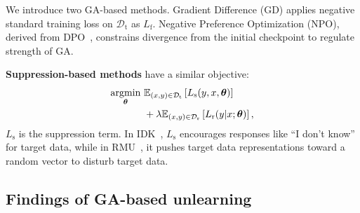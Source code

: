 We introduce two GA-based methods. Gradient Difference (GD) \cite{liu2022continual} applies negative standard training loss on $\mathcal{D}_{\mathrm{t}}$ as $L_{\mathrm{f}}$. Negative Preference Optimization (NPO)\cite{zhang2024negative}, derived from DPO~\cite{rafailov2024direct}, constrains divergence from the initial checkpoint to regulate strength of GA.



\textbf{Suppression-based methods} have a similar objective: \vspace{-0.2in}
\begin{align}
    \underset{\boldsymbol{\theta}}{\operatorname{argmin}} ~ & \mathbb{E}_{(x, y) \in \mathcal{D}_{\mathrm{t}}}\left[L_{\mathrm{s}}(y, x, \boldsymbol{\theta})\right] \notag \\
    &+ \lambda  \mathbb{E}_{(x, y) \in \mathcal{D}_{\mathrm{r}}}\left[L_{\mathrm{r}}(y | x ; \boldsymbol{\theta})\right], \notag
\end{align}
$L_{\mathrm{s}}$ is the suppression term. 
In IDK~\cite{maini2024tofu}, $L_{\mathrm{s}}$ encourages responses like “I don’t know” for target data, while in RMU~\cite{liwmdp}, it pushes target data representations toward a random vector to disturb target data.



\subsection{Findings of GA-based unlearning}



